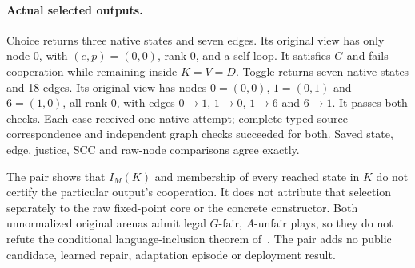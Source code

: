 \paragraph{Actual selected outputs.}
Choice returns three native states and seven edges. Its original view
has only node 0, with $(e,p)=(0,0)$, rank 0, and a self-loop. It satisfies
$G$ and fails cooperation while remaining inside $K=V=D$.
Toggle returns seven native states and 18 edges. Its original view has
nodes $0=(0,0)$, $1=(0,1)$ and $6=(1,0)$, all rank 0, with edges
$0\to1$, $1\to0$, $1\to6$ and $6\to1$. It passes both checks.
Each case received one native attempt; complete typed source
correspondence and independent graph checks succeeded for both. Saved
state, edge, justice, SCC and raw-node comparisons agree exactly.

The pair shows that $I_M(K)$ and membership of every reached state in
$K$ do not certify the particular output's cooperation. It does not
attribute that selection separately to the raw fixed-point core or
the concrete constructor. Both unnormalized original arenas admit
legal $G$-fair, $A$-unfair plays, so they do not refute the conditional
language-inclusion theorem of~\cite{friendly}. The pair adds no public
candidate, learned repair, adaptation episode or deployment result.
